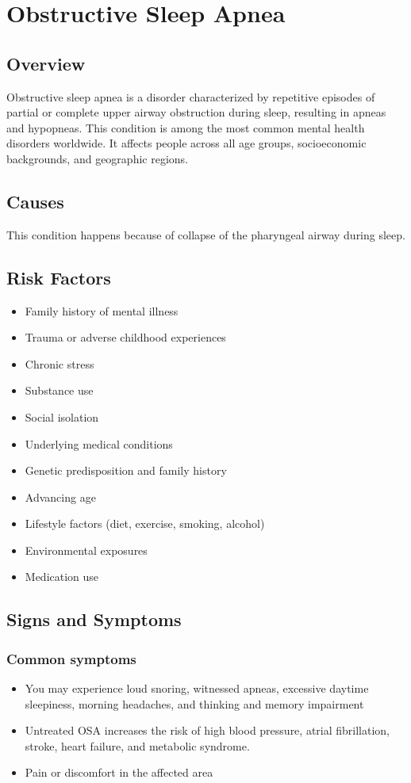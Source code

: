\chapter{Obstructive Sleep Apnea}
\label{sec:throat:Obstructive Sleep Apnea}

\section{Overview}
Obstructive sleep apnea is a disorder characterized by repetitive episodes of partial or complete upper airway obstruction during sleep, resulting in apneas and hypopneas. This condition is among the most common mental health disorders worldwide. It affects people across all age groups, socioeconomic backgrounds, and geographic regions.
\section{Causes}
This condition happens because of collapse of the pharyngeal airway during sleep.     
\section{Risk Factors}

\begin{itemize}[noitemsep]
  \item Family history of mental illness
  \item Trauma or adverse childhood experiences
  \item Chronic stress
  \item Substance use
  \item Social isolation
  \item Underlying medical conditions
  \item Genetic predisposition and family history
  \item Advancing age
  \item Lifestyle factors (diet, exercise, smoking, alcohol)
  \item Environmental exposures
  \item Medication use
\end{itemize}
\section{Signs and Symptoms}

\subsection{Common symptoms}
\begin{itemize}[noitemsep]
  \item You may experience loud snoring, witnessed apneas, excessive daytime sleepiness, morning headaches, and thinking and memory impairment
  \item Untreated OSA increases the risk of high blood pressure, atrial fibrillation, stroke, heart failure, and metabolic syndrome.
  \item Pain or discomfort in the affected area
  \end{itemize}

